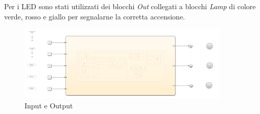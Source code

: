         \noindent Per i LED sono stati utilizzati dei blocchi \textit{Out} collegati a blocchi \textit{Lamp} di colore verde, rosso e giallo per segnalarne la corretta accensione.
    
        \begin{figure}[H]
            \centering
            \includegraphics[width=0.9\textwidth]{figures/state.png}
            \caption{Input e Output}
            \label{state1}
        \end{figure}